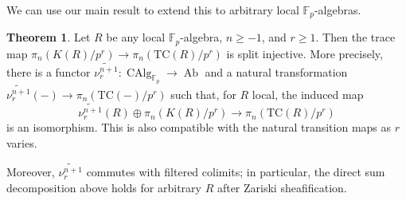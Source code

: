 \documentclass{amsart}
\theoremstyle{definition}
\newtheorem{theorem}[definition]{Theorem}
\newcommand{\bb}{\mathbb}
\newcommand{\To}{\longrightarrow}
\newcommand{\TC}{\mathrm{TC}}
\begin{document}
We can use our main result to extend this to arbitrary local $\bb F_p$-algebras.

\begin{theorem}
Let $R$ be any local $\bb F_p$-algebra, $n\ge-1$, and $r\ge 1$. Then the
trace map $\pi_n (K(R)/p^r) \to \pi_n (\TC(R)/p^r)$ is split injective. More
precisely,  there is a functor $\widetilde{\nu^{n+1}_r}:\operatorname{CAlg}_{\mathbb{F}_p}\rightarrow\operatorname{Ab}$ and a natural transformation $\widetilde{\nu^{n+1}_r}(-)\rightarrow \pi_n(\TC(-)/p^r)$ such that, for $R$ local, the induced map
$$\widetilde{\nu^{n+1}_r}(R)\oplus \pi_n(K(R)/p^r)\To\pi_n(\TC(R)/p^r)$$
is an isomorphism.  This is also compatible with the natural transition maps as $r$ varies.

Moreover, $\widetilde{\nu^{n+1}_r}$ commutes with filtered colimits; in particular, the direct sum decomposition above holds for arbitrary $R$ after Zariski sheafification.
\label{injectivityresult}
\end{theorem}
\end{document}
